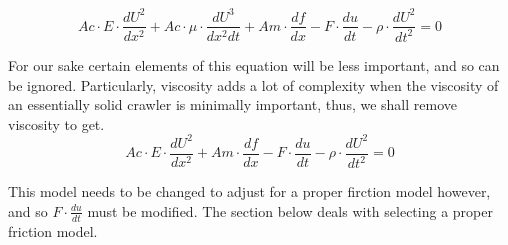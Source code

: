 \documentclass{article}
\begin{document}
\begin{equation}
   Ac \cdot E \cdot \frac{dU^2}{dx^2} + Ac \cdot \mu \cdot \frac{dU^3}{dx^2 dt} + Am \cdot \frac{df}{dx} - F \cdot \frac{du}{dt} - \rho \cdot \frac{dU^2}{dt^2} = 0
   \label{eq:custom}
\end{equation}
\par For our sake certain elements of this equation will be less important, and so can be ignored. Particularly, viscosity adds a lot of complexity when the viscosity of an essentially solid crawler is minimally important, thus, we shall remove viscosity to get. 
\begin{equation}
   Ac \cdot E \cdot \frac{dU^2}{dx^2} + Am \cdot \frac{df}{dx} - F \cdot \frac{du}{dt} - \rho \cdot \frac{dU^2}{dt^2} = 0
   \label{eq:custom}
\end{equation}
\par This model needs to be changed to adjust for a proper firction model however, and so $F \cdot \frac{du}{dt}$ must be modified. The section below deals with selecting a proper friction model.
\end{document}

